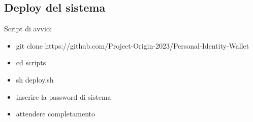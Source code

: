 \subsection{Deploy del sistema}

Script di avvio:
\begin{itemize}
   \item git clone https://github.com/Project-Origin-2023/Personal-Identity-Wallet
   \item cd scripts
   \item sh deploy.sh
   \item inserire la password di sistema
   \item attendere completamento
\end{itemize}